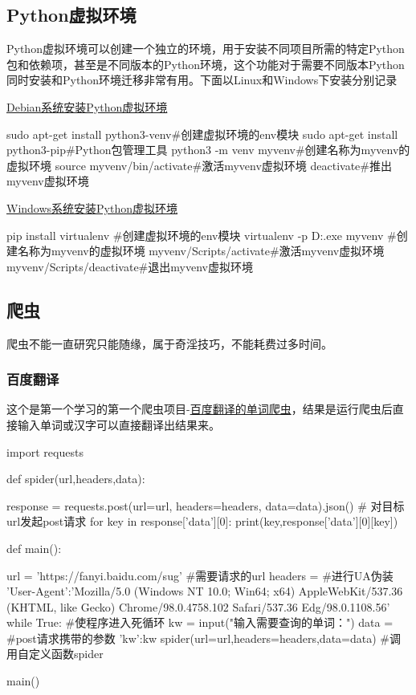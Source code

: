 \subsection{Python虚拟环境}
Python虚拟环境可以创建一个独立的环境，用于安装不同项目所需的特定Python包和依赖项，甚至是不同版本的Python环境，这个功能对于需要不同版本Python同时安装和Python环境迁移非常有用。下面以Linux和Windows下安装分别记录

\href{https://blog.csdn.net/qq_34444097/article/details/142733302?spm=1001.2014.3001.5506}{Debian系统安装Python虚拟环境}
\begin{shell}
sudo apt-get install python3-venv#创建虚拟环境的env模块
sudo apt-get install python3-pip#Python包管理工具
python3 -m venv myvenv#创建名称为myvenv的虚拟环境
source myvenv/bin/activate#激活myvenv虚拟环境
deactivate#推出myvenv虚拟环境
\end{shell}
\href{https://blog.csdn.net/cl_kleiber0802/article/details/142006096?spm=1001.2014.3001.5506}{Windows系统安装Python虚拟环境}
\begin{shell}
pip install virtualenv #创建虚拟环境的env模块
virtualenv -p D:\Python{}\Python.exe myvenv
#创建名称为myvenv的虚拟环境
myvenv/Scripts/activate#激活myvenv虚拟环境
myvenv/Scripts/deactivate#退出myvenv虚拟环境
\end{shell}
\subsection{爬虫}
爬虫不能一直研究只能随缘，属于奇淫技巧，不能耗费过多时间。
\subsubsection{百度翻译}
这个是第一个学习的第一个爬虫项目-\href{https://blog.csdn.net/m0_58378947/article/details/123905684?spm=1001.2014.3001.5506}{百度翻译的单词爬虫}，结果是运行爬虫后直接输入单词或汉字可以直接翻译出结果来。
\begin{shell}
import requests

def spider(url,headers,data):

    response = requests.post(url=url, headers=headers, data=data).json()  # 对目标url发起post请求
    for key in response['data'][0]:
        print(key,response['data'][0][key])

def main():

    url = 'https://fanyi.baidu.com/sug'  #需要请求的url
    headers = {  #进行UA伪装
        'User-Agent':'Mozilla/5.0 (Windows NT 10.0; Win64; x64) AppleWebKit/537.36 (KHTML, like Gecko) Chrome/98.0.4758.102 Safari/537.36 Edg/98.0.1108.56'
    }
    while True:  #使程序进入死循环
        kw = input("输入需要查询的单词：")
        data = {     #post请求携带的参数
            'kw':kw
        }
        spider(url=url,headers=headers,data=data)  #调用自定义函数spider

main()
\end{shell}
